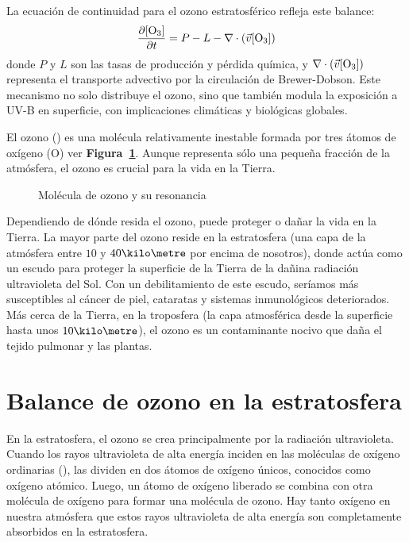 La ecuación de continuidad para el ozono estratosférico refleja este balance:
\begin{equation}
\frac{\partial [\ce{O3}]}{\partial t} = P - L - \nabla \cdot (\vec{v}[\ce{O3}])
\end{equation}
donde \( P \) y \( L \) son las tasas de producción y pérdida química, y \( \nabla \cdot (\vec{v}[\ce{O3}]) \) representa el transporte advectivo por la circulación de Brewer-Dobson. Este mecanismo no solo distribuye el ozono, sino que también modula la exposición a UV-B en superficie, con implicaciones climáticas y biológicas globales.

El ozono () es una molécula relativamente inestable formada por tres átomos de oxígeno (O) ver \textbf{Figura~\ref{reso3}}. Aunque representa sólo una pequeña fracción de la atmósfera, el ozono es crucial para la vida en la Tierra.
\begin{figure}[htbp]
\begin{center}
\caption{Molécula de ozono y su resonancia}
\label{reso3}
\end{center}
\end{figure}


Dependiendo de dónde resida el ozono, puede proteger o dañar la vida en la Tierra. La mayor parte del ozono reside en la estratosfera (una capa de la atmósfera entre $10$ y $40\kilo\metre$  por encima de nosotros), donde actúa como un escudo para proteger la superficie de la Tierra de la dañina radiación ultravioleta del Sol. Con un debilitamiento de este escudo, seríamos más susceptibles al cáncer de piel, cataratas y sistemas inmunológicos deteriorados. Más cerca de la Tierra, en la troposfera (la capa atmosférica desde la superficie hasta unos $10\kilo\metre$), el ozono es un contaminante nocivo que daña el tejido pulmonar y las plantas.

\section{Balance de ozono en la estratosfera}\label{oestra}

En la estratosfera, el ozono se crea principalmente por la radiación ultravioleta. Cuando los rayos ultravioleta de alta energía inciden en las moléculas de oxígeno ordinarias (), las dividen en dos átomos de oxígeno únicos, conocidos como oxígeno atómico.
 Luego, un átomo de oxígeno liberado se combina con otra molécula de oxígeno para formar una molécula de ozono. Hay tanto oxígeno en nuestra atmósfera que estos rayos ultravioleta de alta energía son completamente absorbidos en la estratosfera.

